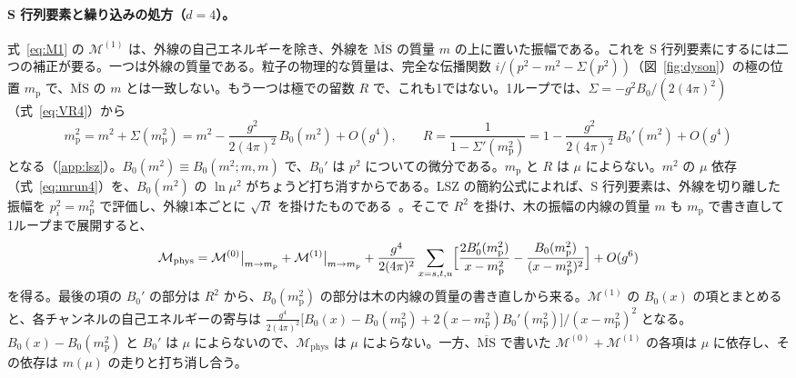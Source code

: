 \documentclass[a4paper,10pt]{ltjsarticle}
\begin{document}
\paragraph{S 行列要素と繰り込みの処方（$d=4$）。}式~\eqref{eq:M1} の $\mathcal{M}^{(1)}$ は、外線の自己エネルギーを除き、外線を $\overline{\mathrm{MS}}$ の質量 $m$ の上に置いた振幅である。これを S 行列要素にするには二つの補正が要る。一つは外線の質量である。粒子の物理的な質量は、完全な伝播関数 $i/(p^2-m^2-\Sigma(p^2))$（図~\ref{fig:dyson}）の極の位置 $m_{\mathrm p}$ で、$\overline{\mathrm{MS}}$ の $m$ とは一致しない。もう一つは極での留数 $R$ で、これも1ではない。1ループでは、$\Sigma=-g^2B_0/(2(4\pi)^2)$（式~\eqref{eq:VR4}）から
\begin{equation}
m_{\mathrm p}^2=m^2+\Sigma(m_{\mathrm p}^2)=m^2-\frac{g^2}{2(4\pi)^2}\,B_0(m^2)+O(g^4),\qquad
R=\frac{1}{1-\Sigma'(m_{\mathrm p}^2)}=1-\frac{g^2}{2(4\pi)^2}\,B_0'(m^2)+O(g^4)
\label{eq:mpole}
\end{equation}
となる（\ref{app:lsz}）。$B_0(m^2)\equiv B_0(m^2;m,m)$ で、$B_0'$ は $p^2$ についての微分である。$m_{\mathrm p}$ と $R$ は $\mu$ によらない。$m^2$ の $\mu$ 依存（式~\eqref{eq:mrun4}）を、$B_0(m^2)$ の $\ln\mu^2$ がちょうど打ち消すからである。LSZ の簡約公式によれば、S 行列要素は、外線を切り離した振幅を $p_i^2=m_{\mathrm p}^2$ で評価し、外線1本ごとに $\sqrt R$ を掛けたものである~\cite{peskin}。そこで $R^2$ を掛け、木の振幅の内線の質量 $m$ も $m_{\mathrm p}$ で書き直して1ループまで展開すると、
\begin{equation}
\mathcal{M}_{\mathrm{phys}}=\mathcal{M}^{(0)}\big|_{m\to m_{\mathrm p}}+\mathcal{M}^{(1)}\big|_{m\to m_{\mathrm p}}
+\frac{g^4}{2(4\pi)^2}\sum_{x=s,t,u}\Bigl[\frac{2B_0'(m_{\mathrm p}^2)}{x-m_{\mathrm p}^2}-\frac{B_0(m_{\mathrm p}^2)}{(x-m_{\mathrm p}^2)^2}\Bigr]+O(g^6)
\label{eq:Mphys}
\end{equation}
を得る。最後の項の $B_0'$ の部分は $R^2$ から、$B_0(m_{\mathrm p}^2)$ の部分は木の内線の質量の書き直しから来る。$\mathcal{M}^{(1)}$ の $B_0(x)$ の項とまとめると、各チャンネルの自己エネルギーの寄与は $\frac{g^4}{2(4\pi)^2}\bigl[B_0(x)-B_0(m_{\mathrm p}^2)+2(x-m_{\mathrm p}^2)B_0'(m_{\mathrm p}^2)\bigr]/(x-m_{\mathrm p}^2)^2$ となる。$B_0(x)-B_0(m_{\mathrm p}^2)$ と $B_0'$ は $\mu$ によらないので、$\mathcal{M}_{\mathrm{phys}}$ は $\mu$ によらない。一方、$\overline{\mathrm{MS}}$ で書いた $\mathcal{M}^{(0)}+\mathcal{M}^{(1)}$ の各項は $\mu$ に依存し、その依存は $m(\mu)$ の走りと打ち消し合う。
\end{document}
